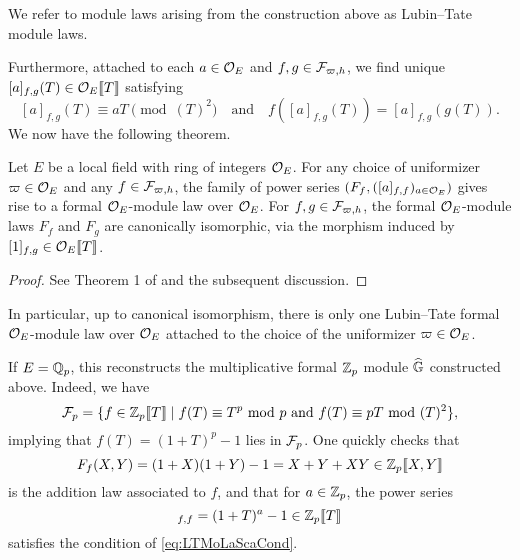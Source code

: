 \documentclass[../main.tex]{subfiles}
\begin{document}
\begin{defi}
  We refer to module laws arising from the construction above as Lubin--Tate module laws.
\end{defi}

Furthermore, attached to each $a \in \mathcal{O}_E$ and $f,g \in \mathcal{F}_{\varpi,h}$, we find
unique $[a]_{f,g}(T) \in \mathcal{O}_E\llbracket T \rrbracket$ satisfying
\begin{equation}\label{eq:LTMoLaScaCond}
  [a]_{f,g}(T) \equiv aT \pmod {(T)^2} \quad \text{and} \quad
  f([a]_{f,g}(T)) = [a]_{f,g}(g(T)).
\end{equation}
We now have the following theorem.
\begin{thm}\label{thm:LTModLaw}
  Let $E$ be a local field with ring of integers $\mathcal{O}_E$. For any choice of 
  uniformizer $\varpi \in \mathcal{O}_E$ and any $f \in \mathcal{F}_{\varpi,h}$, the family of power
  series $(F_f, ([a]_{f,f})_{a \in \mathcal{O}_E})$
  gives rise to a formal $\mathcal{O}_E$-module law over $\mathcal{O}_E$. For 
  $f,g \in \mathcal{F}_{\varpi,h}$, the formal $\mathcal{O}_E$-module laws $F_f$ and $F_g$ are
  canonically isomorphic, via the morphism induced by $[1]_{f,g} \in \mathcal{O}_E\llbracket
  T \rrbracket$. 
\begin{proof}
  See Theorem 1 of \cite{LubinTateFormalMult} and the subsequent discussion.
\end{proof}
\end{thm}
In particular, up to canonical isomorphism, there is only one Lubin--Tate formal
$\mathcal{O}_E$-module law over $\mathcal{O}_E$ attached to the choice of the uniformizer $\varpi \in
\mathcal{O}_E$. 

\begin{xpl}
  If $E = \mathbb{Q}_p$, this reconstructs the multiplicative formal 
  $\mathbb{Z}_p$ module $\widehat{\mathbb{G}}$ constructed above. Indeed, we have 
  \begin{equation*}
    \mathcal{F}_p = \{f \in \mathbb{Z}_p\llbracket T \rrbracket \mid f(T) \equiv T^p \text{ mod } p
    \text{ and } f(T) \equiv pT \text{ mod } (T)^2 \},
  \end{equation*}
  implying that $f(T) = (1+T)^p-1$ lies in $\mathcal{F}_p$.  
  One quickly checks that 
  \begin{equation*}
    F_f(X,Y) = (1+X)(1+Y) - 1 = X + Y + XY \in \mathbb{Z}_p \llbracket X,Y \rrbracket
  \end{equation*}
  is the addition law associated to $f$, and that 
  for $a \in \mathbb{Z}_p$, the power series
  \begin{equation*}
    [a]_{f,f} = (1+T)^{a} - 1 \in \Z_p \llbr T \rrbr
  \end{equation*}
  satisfies the condition of \eqref{eq:LTMoLaScaCond}. 
\end{xpl}
\end{document}
